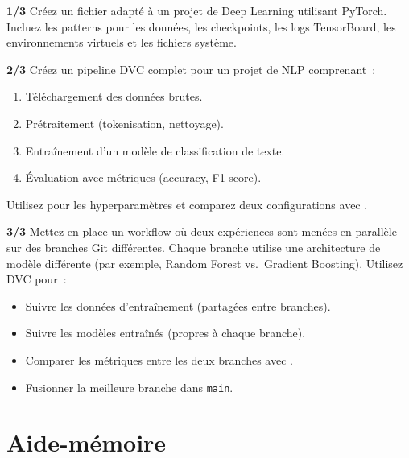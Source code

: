 \begin{exercice}
\textbf{1/3}
Cr\'eez un fichier  adapt\'e \`a un projet de Deep Learning
utilisant PyTorch. Incluez les patterns pour les donn\'ees, les checkpoints,
les logs TensorBoard, les environnements virtuels et les fichiers syst\`eme.
\end{exercice}

\begin{exercice}
\textbf{2/3}
Cr\'eez un pipeline DVC complet pour un projet de NLP comprenant~:
\begin{enumerate}
  \item T\'el\'echargement des donn\'ees brutes.
  \item Pr\'etraitement (tokenisation, nettoyage).
  \item Entra\^inement d'un mod\`ele de classification de texte.
  \item \'Evaluation avec m\'etriques (accuracy, F1-score).
\end{enumerate}
Utilisez  pour les hyperparam\`etres et comparez deux
configurations avec .
\end{exercice}

\begin{exercice}
\textbf{3/3}
Mettez en place un workflow o\`u deux exp\'eriences sont men\'ees en parall\`ele
sur des branches Git diff\'erentes. Chaque branche utilise une architecture
de mod\`ele diff\'erente (par exemple, Random Forest vs.\ Gradient Boosting).
Utilisez DVC pour~:
\begin{itemize}
  \item Suivre les donn\'ees d'entra\^inement (partag\'ees entre branches).
  \item Suivre les mod\`eles entra\^in\'es (propres \`a chaque branche).
  \item Comparer les m\'etriques entre les deux branches avec
        .
  \item Fusionner la meilleure branche dans \texttt{main}.
\end{itemize}
\end{exercice}

\section{Aide-m\'emoire}
\label{sec:cheatsheet-version-control}

